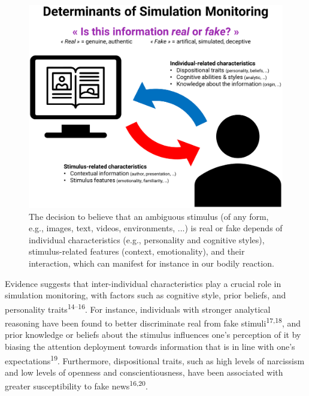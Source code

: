 \documentclass[
  man,floatsintext]{apa6}
\begin{document}
\begin{figure}
\includegraphics[width=1\linewidth]{../figures/Figure1} \caption{The decision to believe that an ambiguous stimulus (of any form, e.g., images, text, videos, environments, ...) is real or fake depends of individual characteristics (e.g., personality and cognitive styles), stimulus-related features (context, emotionality), and their interaction, which can manifest for instance in our bodily reaction.}\label{fig:unnamed-chunk-2}
\end{figure}

Evidence suggests that inter-individual characteristics play a crucial role in simulation monitoring, with factors such as cognitive style, prior beliefs, and personality traits\textsuperscript{14--16}. For instance, individuals with stronger analytical reasoning have been found to better discriminate real from fake stimuli\textsuperscript{17,18}, and prior knowledge or beliefs about the stimulus influences one's perception of it by biasing the attention deployment towards information that is in line with one's expectations\textsuperscript{19}. Furthermore, dispositional traits, such as high levels of narcissism and low levels of openness and conscientiousness, have been associated with greater susceptibility to fake news\textsuperscript{16,20}.
\end{document}
